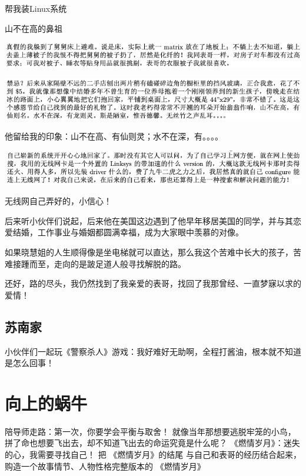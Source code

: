 \documentclass[9pt, b5paper]{article}
\begin{document}
帮我装Linux系统

山不在高的鼻祖

\begin{center}
\includegraphics[width=.9\linewidth]{./pic/backups_plans_20210422_092547.png}
\end{center}

\begin{center}
\includegraphics[width=.9\linewidth]{./pic/backups_plans_20210422_092432.png}
\end{center}

他留给我的印象：山不在高、有仙则灵；水不在深，有。。。。

\begin{center}
\includegraphics[width=.9\linewidth]{./pic/backups_plans_20210422_090613.png}
\end{center}

无线网自己弄好的，小信心！

后来听小伙伴们说起，后来他在美国这边遇到了他早年移居美国的同学，并与其恋爱结婚，工作事业与婚姻都圆满幸福，成为大家眼中羡慕的对像。 

如果晓慧姐的人生顺得像是坐电梯就可以直达，那么我这个苦难中长大的孩子，苦难接踵而至，走向的是跛足道人般寻找解脱的路。

还好，路的尽头，我仍然找到了我亲爱的表哥，找回了我那曾经、一直梦寐以求的爱情！
\subsection{苏南家}
\label{sec:orgc1ca66f}
小伙伴们一起玩《警察杀人》游戏：我好难好无助啊，全程打酱油，根本就不知道是怎么回事！

\section{向上的蜗牛}
\label{sec:org738f3f2}
陪导师走路：第一次，你要学会平衡与取舍！
就像当年那想要逃脱牢笼的小鸟，拼了命也想要飞出去，却不知道飞出去的命运究竟是什么呢？
《燃情岁月》：迷失的心，我需要寻找自己！
把 《燃情岁月》的结尾
与自己和表哥的经历结合起来，购造一个故事情节、人物性格完整版本的 《燃情岁月》
\end{document}
